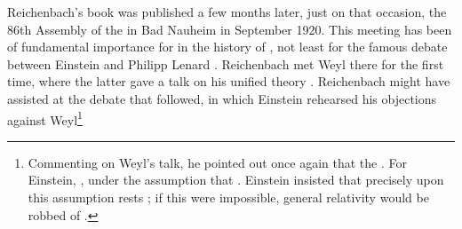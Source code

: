 \documentclass[draft]{article}
\begin{document}
Reichenbach's book was published a few months later, just on that occasion, the 86th Assembly of the  in Bad Nauheim in September 1920. This meeting has been of fundamental importance for in the history of \rt, not least for the famous debate between Einstein and Philipp Lenard \citep{Dongen2007}. Reichenbach met Weyl there for the first time, where the latter gave a talk on his unified theory \citep{Weyl1920}. Reichenbach might have assisted at the debate that followed, in which Einstein rehearsed his objections against Weyl\footnote{Commenting on Weyl's talk, he pointed out once again that the   \citep[650]{Einstein1920c}. For Einstein, , under the assumption that  \citep[650]{Einstein1920c}. Einstein insisted that precisely upon this assumption rests ; if this were impossible, general relativity would be robbed of  \citep[650]{Einstein1920c}.
}
\end{document}

